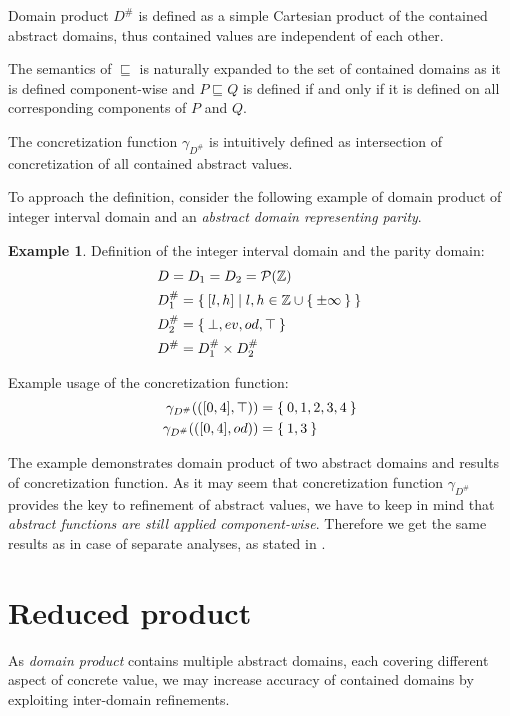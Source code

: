 \documentclass[12pt,oneside]{fithesis2}
\theoremstyle{definition}
\newtheorem{exmp}{Example}[section]
\begin{document}
Domain product $D^\#$ is defined as a simple Cartesian product of the contained abstract domains, thus contained values are independent of each other.

The semantics of $\sqsubseteq$ is naturally expanded to the set of contained domains as it is defined component-wise and $P \sqsubseteq Q$ is defined if and only if it is defined on all corresponding components of $P$ and $Q$.

The concretization function $\gamma_{D^\#}$ is intuitively defined as intersection of concretization of all contained abstract values.

To approach the definition, consider the following example of domain product of integer interval domain and an \textit{abstract domain representing parity}.

\begin{exmp}\label{exmp:domain-product}
  Definition of the integer interval domain and the parity domain:
  \begin{align*}
    &D = D_1 = D_2 = \mathcal P(\mathbb Z)\\
    &D^\#_1 = \Set{[l,h] | l,h \in \mathbb{Z} \cup \Set{\pm\infty}}\\
    &D^\#_2 = \Set{\bot, ev, od, \top}\\
    &D^\# = D^\#_1 \times D^\#_2
  \end{align*}

  Example usage of the concretization function:
  \begin{align*}
    \gamma_{D^\#}(\left( [0, 4], \top \right)) &= \Set{0,1,2,3,4}\\
    \gamma_{D^\#}(\left( [0, 4], od \right)) &= \Set{1,3}
  \end{align*}
\end{exmp}

The example demonstrates domain product of two abstract domains and results of concretization function. As it may seem that concretization function $\gamma_{D^\#}$ provides the key to refinement of abstract values, we have to keep in mind that \textit{abstract functions are still applied component-wise}. Therefore we get the same results as in case of separate analyses, as stated in \cite{CousotCousot79-1}.

\section{Reduced product}\label{sec:reduced-cardinality-product}

As \textit{domain product} contains multiple abstract domains, each covering different aspect of concrete value, we may increase accuracy of contained domains by exploiting inter-domain refinements.
\end{document}
